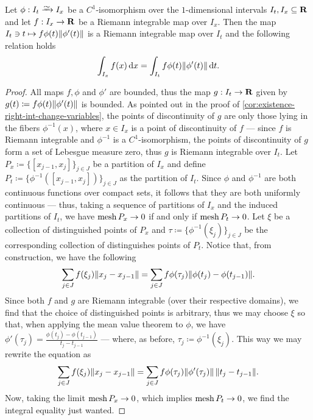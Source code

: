\begin{lemma}
    \label{lem:change-variables-one-dimensional}
    Let \(\phi: I_t \isoto I_x\) be a \(C^1\)-isomorphism over the \(1\)-dimensional
    intervals \(I_t, I_x \subseteq \mathbf{R}\) and let \(f: I_x \to \mathbf{R}\) be a Riemann
    integrable map over \(I_x\). Then the map \(I_t \ni t \mapsto f \phi(t)
    \lVert\phi'(t)\rVert\) is a Riemann integrable map over \(I_t\) and the following
    relation holds
    \[
        \int_{I_x} f(x)\, \mathrm{d} x = \int_{I_t} f \phi(t) \lVert\phi'(t)\rVert\, \mathrm{d} t.
    \]
\end{lemma}

\begin{proof}
    All maps \(f, \phi\) and \(\phi'\) are bounded, thus the map \(g: I_t \to \mathbf{R}\)
    given by \(g(t) \coloneq f \phi(t) \lVert\phi'(t)\rVert\) is bounded. As pointed out
    in the proof of \cref{cor:existence-right-int-change-variables}, the points of
    discontinuity of \(g\) are only those lying in the fibers \(\phi^{-1}(x)\),
    where \(x \in I_x\) is a point of discontinuity of \(f\) --- since \(f\) is
    Riemann integrable and \(\phi^{-1}\) is a \(C^1\)-isomorphism, the points of
    discontinuity of \(g\) form a set of Lebesgue measure zero, thus \(g\) is
    Riemann integrable over \(I_t\). Let \(P_x \coloneq \{[x_{j-1}, x_{j}]\}_{j \in
    J}\) be a partition of \(I_x\) and define \(P_t \coloneq \{\phi^{-1}([x_{j-1},
        x_j])\}_{j \in J}\) as the partition of \(I_t\). Since \(\phi\) and
    \(\phi^{-1}\) are both continuous functions over compact sets, it follows that
    they are both uniformly continuous --- thus, taking a sequence of partitions
    of \(I_x\) and the induced partitions of \(I_t\), we have \(\operatorname{mesh} P_x \to 0\) if
    and only if \(\operatorname{mesh} P_t \to 0\). Let \(\xi\) be a collection of distinguished
    points of \(P_x\) and \(\tau \coloneq \{\phi^{-1}(\xi_{j})\}_{j \in J}\) be the
    corresponding collection of distinguishes points of \(P_t\). Notice that,
    from construction, we have the following
    \[
        \sum_{j \in J} f(\xi_{j}) \lVert x_j - x_{j-1}\rVert
        = \sum_{j \in J} f \phi(\tau_j) \lVert\phi(t_j) - \phi(t_{j-1})\rVert.
    \]
    Since both \(f\) and \(g\) are Riemann integrable (over their respective
    domains), we find that the choice of distinguished points is arbitrary, thus we
    may choose \(\xi\) so that, when applying the mean value theorem to \(\phi\), we
    have \(\phi'(\tau_j) = \frac{\phi(t_j) - \phi(t_{j-1})}{t_j - t_{j-1}}\) ---
    where, as before, \(\tau_j \coloneq \phi^{-1}(\xi_j)\). This way we may rewrite
    the equation as
    \[
        \sum_{j \in J} f(\xi_{j}) \lVert x_j - x_{j-1}\rVert
        = \sum_{j \in J} f \phi(\tau_{j}) \lVert\phi'(\tau_{j})\rVert\,
        \lVert t_j - t_{j - 1}\rVert.
    \]
    Now, taking the limit \(\operatorname{mesh} P_x \to 0\), which implies \(\operatorname{mesh} P_t \to 0\), we
    find the integral equality just wanted.
\end{proof}

